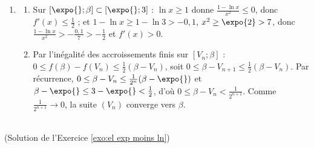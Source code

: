 \begin{corrige}
\begin{sol}
\begin{enumerate}
\begin{enumerate}
            c'est la plus petite, $\alpha$ ; celle de $[\expo{};3]$ est $\beta$ ($\beta \simeq 2{,}736$).
      \item $V_0 = \expo{} \in [\expo{};\beta]$. Si $\expo{} \leq V_n \leq \beta$, comme $f$ est croissante, $f(\expo{}) \leq V_{n+1} \leq f(\beta) = \beta$, et
            $f(\expo{}) = \expo{} + g(\expo{}) > \expo{}$. Donc $V_{n+1} \in [\expo{};\beta]$.
      \end{enumerate}
\item \begin{enumerate}
      \item Sur $[\expo{};\beta] \subset [\expo{};3]$ : $\ln x \geq 1$ donne $\frac{1 - \ln x}{x^2} \leq 0$, donc $f'(x) \leq \frac{1}{2}$ ;
            et $1 - \ln x \geq 1 - \ln 3 > -0{,}1$, $x^2 \geq \expo{2} > 7$, donc $\frac{1 - \ln x}{x^2} > -\frac{0{,}1}{7} > -\frac{1}{2}$ et $f'(x) > 0$.
      \item Par l'in\'egalit\'e des accroissements finis sur $[V_n;\beta]$ : $0 \leq f(\beta) - f(V_n) \leq \frac{1}{2}(\beta - V_n)$, soit
            $0 \leq \beta - V_{n+1} \leq \frac{1}{2}(\beta - V_n)$. Par r\'ecurrence, $0 \leq \beta - V_n \leq \frac{1}{2^n}(\beta - \expo{})$ et
            $\beta - \expo{} \leq 3 - \expo{} < \frac{1}{2}$, d'o\`u $0 \leq \beta - V_n < \frac{1}{2^{n+1}}$.
            Comme $\frac{1}{2^{n+1}} \to 0$, la suite $(V_n)$ converge vers $\beta$.
      \end{enumerate}
\end{enumerate}
\end{sol}

\begin{sol} ~ \\
(Solution de l'Exercice \ref{exo:el exp moins ln})


\end{sol}
\end{corrige}
